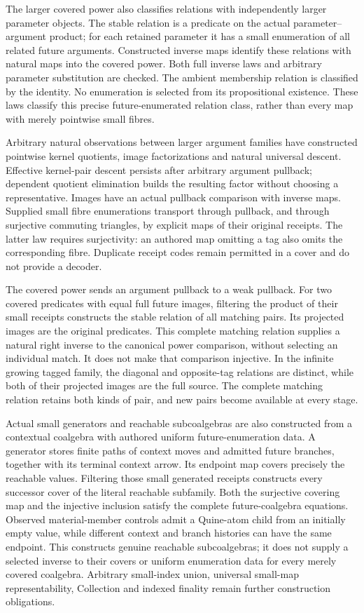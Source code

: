 \documentclass[11pt]{article}
\theoremstyle{definition}
\theoremstyle{remark}
\begin{document}
The larger covered power also classifies relations with independently
larger parameter objects.  The stable relation is a predicate on the
actual parameter--argument product; for each retained parameter it has
a small enumeration of all related future arguments.  Constructed
inverse maps identify these relations with natural maps into the covered
power.  Both full inverse laws and arbitrary parameter substitution are
checked.  The ambient membership relation is classified by the identity.
No enumeration is selected from its propositional existence.  These laws
classify this precise future-enumerated relation class, rather than every
map with merely pointwise small fibres.

Arbitrary natural observations between larger argument families have
constructed pointwise kernel quotients, image factorizations and natural
universal descent.  Effective kernel-pair descent persists after arbitrary
argument pullback; dependent quotient elimination builds the resulting
factor without choosing a representative.  Images have an actual
pullback comparison with inverse maps.  Supplied small fibre enumerations
transport through pullback, and through surjective commuting triangles,
by explicit maps of their original receipts.  The latter law requires
surjectivity: an authored map omitting a tag also omits the corresponding
fibre.  Duplicate receipt codes remain permitted in a cover and do not
provide a decoder.

The covered power sends an argument pullback to a weak pullback.  For two
covered predicates with equal full future images, filtering the product
of their small receipts constructs the stable relation of all matching
pairs.  Its projected images are the original predicates.  This complete
matching relation supplies a natural right inverse to the canonical
power comparison, without selecting an individual match.  It does not
make that comparison injective.  In the infinite growing tagged family,
the diagonal and opposite-tag relations are distinct, while both of
their projected images are the full source.  The complete matching
relation retains both kinds of pair, and new pairs become available at
every stage.

Actual small generators and reachable subcoalgebras are also constructed
from a contextual coalgebra with authored uniform future-enumeration data.
A generator stores finite paths of context moves and admitted future
branches, together with its terminal context arrow.  Its endpoint map
covers precisely the reachable values.  Filtering those small generated
receipts constructs every successor cover of the literal reachable
subfamily.  Both the surjective covering map and the injective inclusion
satisfy the complete future-coalgebra equations.  Observed material-member
controls admit a Quine-atom child from an initially empty value, while
different context and branch histories can have the same endpoint.  This
constructs genuine reachable subcoalgebras; it does not supply a selected
inverse to their covers or uniform enumeration data for every merely
covered coalgebra.  Arbitrary small-index union, universal small-map
representability, Collection and indexed finality remain further
construction obligations.
\end{document}
